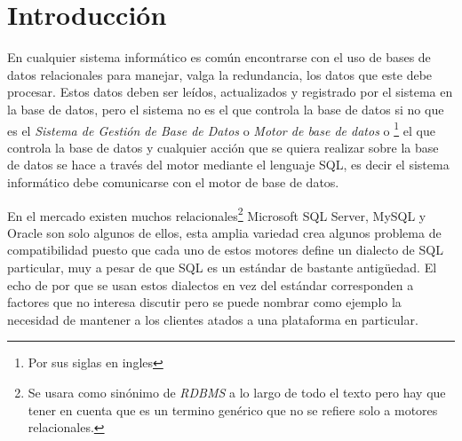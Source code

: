 \chapter{Introducción}\label{capitulo:intro}
En cualquier sistema informático es común encontrarse con el uso de bases de datos relacionales para manejar, valga la redundancia, los datos que este debe procesar. Estos datos deben ser leídos, actualizados y registrado por el sistema en la base de datos, pero el sistema no es el que controla la base de datos si no que es el \textit{Sistema de Gestión de Base de Datos} o \textit{Motor de base de datos} o \textit{\dd}\footnote{Por sus siglas en ingles} el que controla la base de datos y cualquier acción que se quiera realizar sobre la base de datos se hace a través del motor mediante el lenguaje SQL, es decir el sistema informático debe comunicarse con el motor de base de datos.

En el mercado existen muchos \dd relacionales\footnote{Se usara \dd como sinónimo de \textit{RDBMS} a lo largo de todo el texto pero hay que tener en cuenta que \dd es un termino genérico que no se refiere solo a motores relacionales.} Microsoft SQL Server, MySQL y Oracle son solo algunos de ellos, esta amplia variedad crea algunos problema de compatibilidad puesto que cada uno de estos motores define un dialecto de SQL particular, muy a pesar de que SQL es un estándar de bastante antigüedad. El echo de por que se usan estos dialectos en vez del estándar corresponden a factores que no interesa discutir pero se puede nombrar como ejemplo la necesidad de mantener a los clientes atados a una plataforma en particular.

